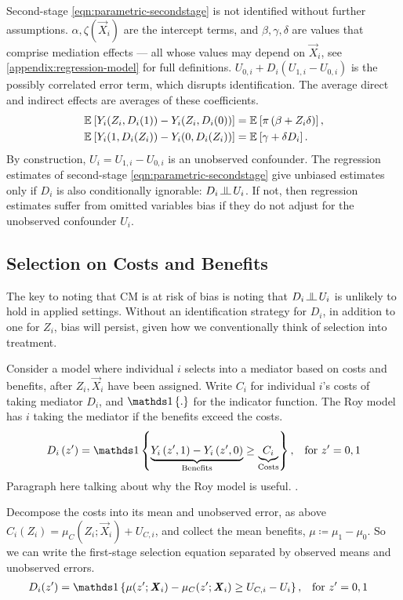 Second-stage \eqref{eqn:parametric-secondstage} is not identified without further assumptions.
$\alpha, \zeta(\vec X_i)$ are the intercept terms, and $\beta, \gamma, \delta$ are values that comprise mediation effects --- all whose values may depend on $\vec X_i$, see \autoref{appendix:regression-model} for full definitions.
$U_{0,i} + D_i \left( U_{1,i} - U_{0,i} \right)$ is the possibly correlated error term, which disrupts identification.
The average direct and indirect effects are averages of these coefficients.
\begin{align*}
    \mathbb{E}_{} \left[ Y_i(Z_i, D_i(1)) - Y_i(Z_i, D_i(0)) \right]
        &= \mathbb{E}_{} \left[ \pi \left( \beta +  Z_i \delta \right) \right], \\
    \mathbb{E}_{} \left[ Y_i(1, D_i(Z_i)) - Y_i(0, D_i(Z_i)) \right]
        &= \mathbb{E}_{} \left[ \gamma + \delta D_i \right].
\end{align*}
By construction, $U_i = U_{1, i} - U_{0, i}$ is an unobserved confounder.
The regression estimates of second-stage \eqref{eqn:parametric-secondstage} give unbiased estimates only if $D_i$ is also conditionally ignorable: $D_i \indep  U_i$.
If not, then regression estimates suffer from omitted variables bias if they do not adjust for the unobserved confounder $U_i$.

\subsection{Selection on Costs and Benefits}
The key to noting that CM is at risk of bias is noting that $D_i \indep  U_i$ is unlikely to hold in applied settings.
Without an identification strategy for $D_i$, in addition to one for $Z_i$, bias will persist, given how we conventionally think of selection into treatment.

Consider a model where individual $i$ selects into a mediator based on costs and benefits, after $Z_i, \vec X_i$ have been assigned.
Write $C_i$ for individual $i$'s costs of taking mediator $D_i$, and $\indicator{.}$ for the indicator function.
The Roy model has $i$ taking the mediator if the benefits exceed the costs.
\[ D_i \left( z' \right) = \indicator{
    \underbrace{Y_i\left( z', 1 \right) - Y_i\left( z', 0 \right)}_{\text{Benefits}}
    \geq \underbrace{C_i}_{\text{Costs}}}, \;\;\; \text{for } z'=0,1 \]
Paragraph here talking about why the Roy model is useful.
\citep{roy1951some,heckman1990empirical}.

Decompose the costs into its mean and unobserved error, as above $C_i(Z_i) = \mu_{C}(Z_i; \vec X_i) + U_{C,i}$, and collect the mean benefits, $\mu \coloneqq \mu_1 - \mu_0$.
So we can write the first-stage selection equation separated by observed means and unobserved errors.
\begin{align*}
    D_i(z') &= \indicator{
        \mu(z'; \vec X_i) - \mu_C(z'; \vec X_i) \geq U_{C,i} - U_i }
        , \;\;\; \text{for } z'=0,1
\end{align*}

